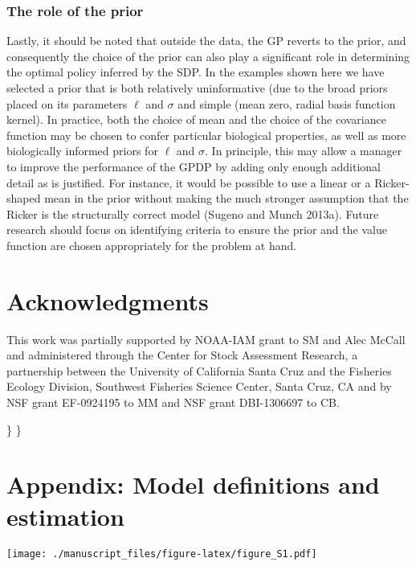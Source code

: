 \documentclass[]{components/elsarticle}
\begin{document}
\subsubsection{The role of the prior}\label{the-role-of-the-prior}

Lastly, it should be noted that outside the data, the GP reverts to the
prior, and consequently the choice of the prior can also play a
significant role in determining the optimal policy inferred by the SDP.
In the examples shown here we have selected a prior that is both
relatively uninformative (due to the broad priors placed on its
parameters $\ell$ and $\sigma$ and simple (mean zero, radial basis
function kernel). In practice, both the choice of mean and the choice of
the covariance function may be chosen to confer particular biological
properties, as well as more biologically informed priors for $\ell$ and
$\sigma$. In principle, this may allow a manager to improve the
performance of the GPDP by adding only enough additional detail as is
justified. For instance, it would be possible to use a linear or a
Ricker-shaped mean in the prior without making the much stronger
assumption that the Ricker is the structurally correct model (Sugeno and
Munch 2013a). Future research should focus on identifying criteria to
ensure the prior and the value function are chosen appropriately for the
problem at hand.

\section{Acknowledgments}\label{acknowledgments}

This work was partially supported by NOAA-IAM grant to SM and Alec
McCall and administered through the Center for Stock Assessment
Research, a partnership between the University of California Santa Cruz
and the Fisheries Ecology Division, Southwest Fisheries Science Center,
Santa Cruz, CA and by NSF grant EF-0924195 to MM and NSF grant
DBI-1306697 to CB.

\appendix
\renewcommand*{\thefigure}{S\arabic{figure}}
\renewcommand*{\thetable}{S\arabic{table}} \setcounter{figure}{0}\}
\setcounter{table}{0}\}

\section{Appendix: Model definitions and
estimation}\label{appendix-model-definitions-and-estimation}

\texttt{[image: ./manuscript\_files/figure-latex/figure\_S1.pdf]}
\end{document}
